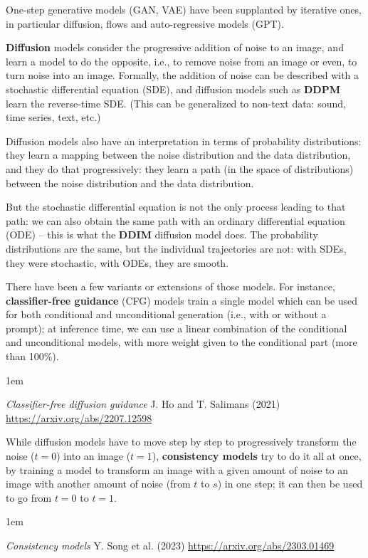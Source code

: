 \documentclass[a5paper]{article}
\let\d\textbf
\newenvironment{reference}{%
  \medskip\goodbreak
  \parskip 0pt
  \raggedright
  \leftskip 1em
  \obeylines
}{\par\medskip\goodbreak}
\begin{document}
One-step generative models (GAN, VAE) have been supplanted by iterative ones,
in particular diffusion, flows and auto-regressive models (GPT).

\d{Diffusion} models consider the progressive addition of noise to an image,
and learn a model to do the opposite, i.e., to remove noise from an image or even,
to turn noise into an image. Formally, the addition of noise
can be described with a stochastic differential equation (SDE),
and diffusion models such as \d{DDPM} learn the reverse-time SDE.
(This can be generalized to non-text data: sound, time series, text, etc.)

Diffusion models also have an interpretation in terms of probability distributions:
they learn a mapping between the noise distribution and the data distribution,
and they do that progressively: they learn a path (in the space of distributions)
between the noise distribution and the data distribution.

But the stochastic differential equation is not the only process leading to that path:
we can also obtain the same path with an ordinary differential equation (ODE) --
this is what the \d{DDIM} diffusion model does. The probability distributions are the same,
but the individual trajectories are not: with SDEs, they were stochastic,
with ODEs, they are smooth.

There have been a few variants or extensions of those models.
For instance, \d{classifier-free guidance} (CFG) models train a single model
which can be used for both conditional and unconditional generation
(i.e., with or without a prompt); at inference time, we can use
a linear combination of the conditional and unconditional models,
with more weight given to the conditional part (more than 100\%).

\begin{reference}
  \emph{Classifier-free diffusion guidance}
  J. Ho and T. Salimans (2021)
  \url{https://arxiv.org/abs/2207.12598}
\end{reference}

While diffusion models have to move step by step to progressively transform the noise ($t=0$) into an image ($t=1$),
\d{consistency models} try to do it all at once, by training a model to transform an image
with a given amount of noise to an image with another amount of noise (from $t$ to $s$) in one step;
it can then be used to go from $t=0$ to $t=1$.

\begin{reference}
  \emph{Consistency models}
  Y. Song et al. (2023)
  \url{https://arxiv.org/abs/2303.01469}
\end{reference}
\end{document}
